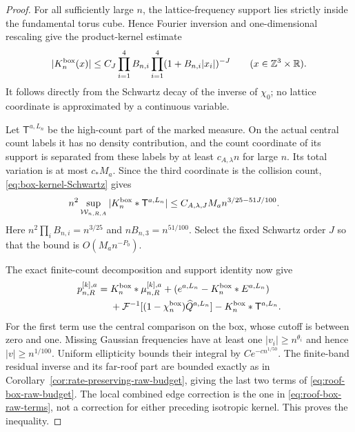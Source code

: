 \begin{proof}
For all sufficiently large $n$, the lattice-frequency support lies
strictly inside the fundamental torus cube. Hence Fourier inversion
and one-dimensional rescaling give the product-kernel estimate
\begin{equation}\label{eq:box-kernel-Schwartz}
 |K_n^{\rm box}(x)|\le C_J\prod_{i=1}^4 B_{n,i}
                  \prod_{i=1}^4(1+B_{n,i}|x_i|)^{-J}
 \qquad(x\in\Z^3\times\R).
\end{equation}
It follows directly from the Schwartz decay of the inverse of $\chi_0$;
no lattice coordinate is approximated by a continuous variable.

Let $\mathsf T^{a,L_n}$ be the high-count part of the marked measure.
On the actual central count labels it has no density contribution,
and the count coordinate of its support is separated from these
labels by at least $c_{A,\lambda}n$ for large $n$. Its total variation
is at most $c_*M_a$. Since the third coordinate is the collision
count, \eqref{eq:box-kernel-Schwartz} gives
\begin{align}
 n^2\sup_{\mathcal W_{n,R,A}}
             |K_n^{\rm box}*\mathsf T^{a,L_n}|
 &\le C_{A,\lambda,J}M_a n^{3/25-51J/100}.
 \label{eq:box-count-separation}
\end{align}
Here $n^2\prod_i B_{n,i}=n^{3/25}$ and
$nB_{n,3}=n^{51/100}$. Select the fixed Schwartz order $J$ so that
the bound is $O(M_an^{-P_0})$.

The exact finite-count decomposition and support identity now give
\begin{align*}
 p_{n,R}^{[k],a}={}&K_n^{\rm box}*\mu_{n,R}^{[k],a}
 +(e^{a,L_n}-K_n^{\rm box}*E^{a,L_n})\\
 &+\mathcal F^{-1}[(1-\chi_n^{\rm box})\widehat Q^{a,L_n}]
       -K_n^{\rm box}*\mathsf T^{a,L_n}.
\end{align*}
For the first term use the central comparison on the box, whose
cutoff is between zero and one. Missing Gaussian frequencies have
at least one $|v_i|\ge n^{\theta_i}$ and hence
$|v|\ge n^{1/100}$. Uniform ellipticity bounds their integral by
$Ce^{-cn^{1/50}}$. The finite-band residual inverse and its far-roof
part are bounded exactly as in
Corollary~\ref{cor:rate-preserving-raw-budget}, giving the last two
terms of \eqref{eq:roof-box-raw-budget}. The local combined edge
correction is the one in \eqref{eq:roof-box-raw-terms}, not a correction
for either preceding isotropic kernel. This proves the inequality.
\end{proof}

